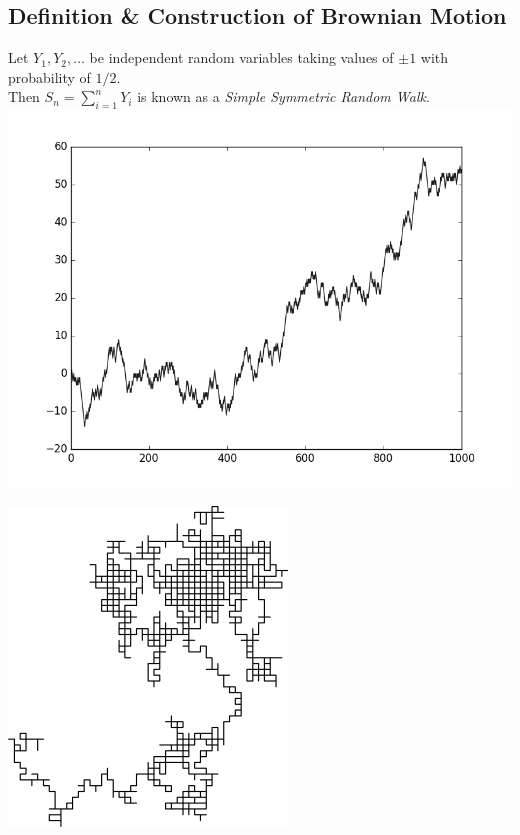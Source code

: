 \documentclass[11pt,a4paper]{article}
\begin{document}
\subsection{Definition \& Construction of Brownian Motion}

Let $Y_1,Y_2,\dots$ be independent random variables taking values of $\pm 1$ with probability of $1/2$.\\
Then $S_n=\sum_{i=1}^n Y_i$ is known as a \textit{Simple Symmetric Random Walk}.\\

\includegraphics[scale=0.3]{img/ssrw1.png}

\includegraphics[scale=0.3]{img/ssrw2.png}
\end{document}
